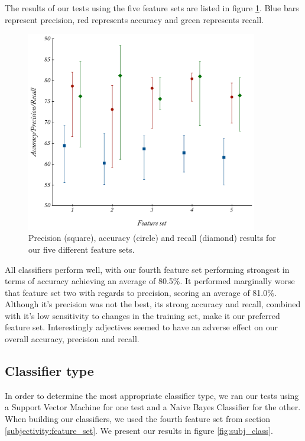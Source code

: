 The results of our tests using the five feature sets are listed in figure \ref{fig:subj_multi}. Blue bars represent precision, red represents accuracy and green represents recall.

\begin{figure}
	\caption{Precision (square), accuracy (circle) and recall (diamond) results for our five different feature sets.}
	\label{fig:subj_multi}
	\centering
		\includegraphics[width=0.9\textwidth]{graphs/subj_multi.pdf}
\end{figure}

All classifiers perform well, with our fourth feature set performing strongest in terms of accuracy achieving an average of 80.5\%. It performed marginally worse that feature set two with regards to precision, scoring an average of 81.0\%. Although it's precision was not the best, its strong accuracy and recall, combined with it's low sensitivity to changes in the training set, make it our preferred feature set. Interestingly adjectives seemed to have an adverse effect on our overall accuracy, precision and recall.

\subsection{Classifier type}

In order to determine the most appropriate classifier type, we ran our tests using a Support Vector Machine for one test and a Naive Bayes Classifier for the other. When building our classifiers, we used the fourth feature set from section \ref{subjectivity:feature_set}. We present our results in figure \ref{fig:subj_class}.

